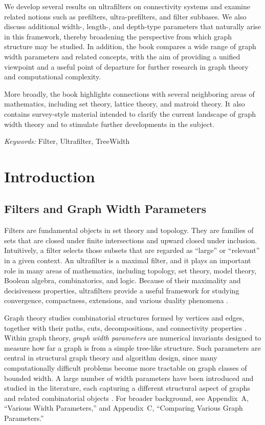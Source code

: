 \documentclass[10pt]{book}
\theoremstyle{definition}
\begin{document}
We develop several results on ultrafilters on connectivity systems and examine related notions such as prefilters, ultra-prefilters, and filter subbases. We also discuss additional width-, length-, and depth-type parameters that naturally arise in this framework, thereby broadening the perspective from which graph structure may be studied. In addition, the book compares a wide range of graph width parameters and related concepts, with the aim of providing a unified viewpoint and a useful point of departure for further research in graph theory and computational complexity.

More broadly, the book highlights connections with several neighboring areas of mathematics, including set theory, lattice theory, and matroid theory. It also contains survey-style material intended to clarify the current landscape of graph width theory and to stimulate further developments in the subject.

\textit{Keywords:} Filter, Ultrafilter, TreeWidth

\chapter{Introduction}
\section{Filters and Graph Width Parameters}
Filters are fundamental objects in set theory and topology.
They are families of sets that are closed under finite intersections and upward closed under inclusion.
Intuitively, a filter selects those subsets that are regarded as ``large'' or ``relevant'' in a given context.
An ultrafilter is a maximal filter, and it plays an important role in many areas of mathematics, including topology, set theory, model theory, Boolean algebra, combinatorics, and logic.
Because of their maximality and decisiveness properties, ultrafilters provide a useful framework for studying convergence, compactness, extensions, and various duality phenomena
\cite{73,74}.

Graph theory studies combinatorial structures formed by vertices and edges, together with their paths, cuts, decompositions, and connectivity properties \cite{236,237,238}.
Within graph theory, \emph{graph width parameters} are numerical invariants designed to measure how far a graph is from a simple tree-like structure.
Such parameters are central in structural graph theory and algorithm design, since many computationally difficult problems become more tractable on graph classes of bounded width.
A large number of width parameters have been introduced and studied in the literature, each capturing a different structural aspect of graphs and related combinatorial objects \cite{16,albrechtsen2024tangle,47}.
For broader background, see Appendix~A, ``Various Width Parameters,'' and Appendix~C, ``Comparing Various Graph Parameters.''
\end{document}
